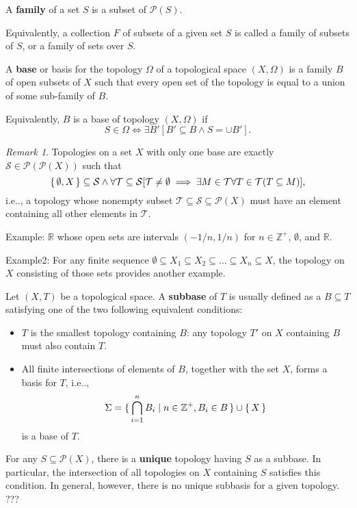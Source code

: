 \documentclass[12pt, letterpaper]{article}
\makeatletter
\newcommand{\inte}{\mathbb{Z}}
\newcommand{\re}{\mathbb{R}}
\newcommand\ie{i.e\@ifnextchar.{}{.\@}}
\newcommand{\red}[1]{{\color{red} #1}}
\newcommand{\power}{\mathcal{P}}
\theoremstyle{definition}
\theoremstyle{remark}
\newtheorem*{rem*}{Remark}
\theoremstyle{definition}
\theoremstyle{plain}
\makeatother
\begin{document}
	\begin{def*}[family]
		A \textbf{family} of a set $S$ is a subset of $\power(S)$.
		
		Equivalently, a collection $F$ of subsets of a given set $S$ is called a family of subsets of $S$, or a family of sets over $S$.
	\end{def*}
	\begin{def*}[base]
		A \textbf{base} or basis for the topology $\Omega$ of a topological space $(X, \Omega)$
		is a family $B$ of open subsets of $X$ such that every open set of the topology is equal to a union of some sub-family of $B$.
		
		Equivalently, $B$ is a base of topology $(X, \Omega)$ if
		\[S\in\Omega\iff \exists B'[B'\subseteq B\land S=\cup B'].\]
	\end{def*}
	\begin{rem*}
		Topologies on a set $X$ with only one base are exactly
		$\mathcal{S}\in\power(\power(X))$
		such that \[\set{\emptyset,X}\subseteq \mathcal{S} \land \forall \mathcal{T}\subseteq\mathcal{S}[\mathcal{T}\ne\emptyset\implies \exists
		M\in \mathcal{T}\forall T\in \mathcal{T}( T\subseteq M)],\]
		\ie, a topology whose nonempty subset $\mathcal{T}\subseteq \mathcal{S}\subseteq\power(X)$
		must have an element containing all other elements in $\mathcal{T}$.
		
		Example:
		$\re$ whose open sets are intervals $(-1/n,1/n)$ for $n\in \inte^+$, $\emptyset$, and $\re$.
		
		Example2:
		For any finite sequence $\emptyset\subseteq X_1\subseteq X_2\subseteq\dots\subseteq
		X_n\subseteq X$, the topology on $X$ consisting of those sets provides another example.
	\end{rem*}

	\begin{def*}[subbase]
		Let $(X, T)$ be a topological space.
		A \textbf{subbase} of $T$ is usually defined as a $B \subseteq T$
		satisfying one of the two following equivalent conditions:
		\begin{itemize}
			\item $T$ is the smallest topology containing $B$:
			any topology $T'$ on $X$ containing $B$ must also contain $T$.
			\item All finite intersections of elements of $B$, together with the set $X$, forms a basis for $T$, \ie,
			\[\Sigma=\set{\bigcap_{i=1}^n B_i |n\in\inte^+,B_i\in B}\cup\set{X} \]
			is a base of $T$.
		\end{itemize}

		For any $S \subseteq \power(X)$, there is a \textbf{unique} topology having $S$ as a subbase. In particular, the intersection of all topologies on $X$ containing $S$ satisfies this condition. \red{In general, however, there is no unique subbasis for a given topology. ???}
	\end{def*}
\end{document}
